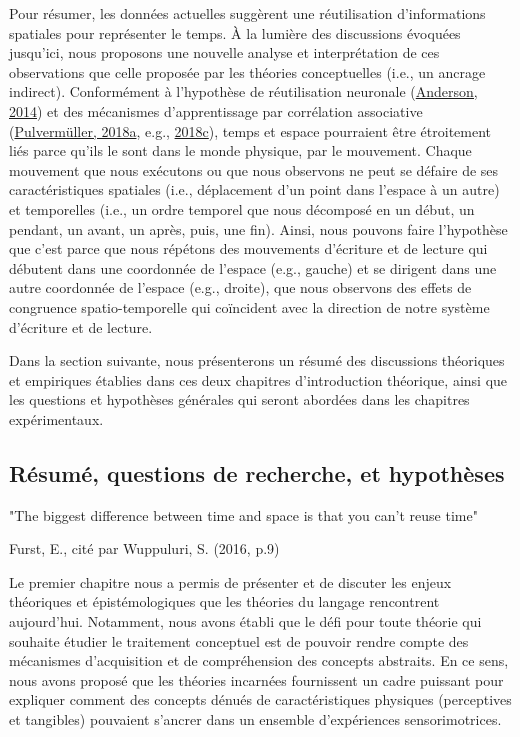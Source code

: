 \documentclass[
  a4paper,12pt,twoside,onecolumn,openright,final,oldfontcommands]{memoir}
\begin{document}
Pour résumer, les données actuelles suggèrent une réutilisation d'informations spatiales pour représenter le temps. À la lumière des discussions évoquées jusqu'ici, nous proposons une nouvelle analyse et interprétation de ces observations que celle proposée par les théories conceptuelles (i.e., un ancrage indirect). Conformément à l'hypothèse de réutilisation neuronale (\protect\hyperlink{ref-anderson_after_2014}{Anderson, 2014}) et des mécanismes d'apprentissage par corrélation associative (\protect\hyperlink{ref-pulvermuller_neural_2018}{Pulvermüller, 2018a}, e.g., \protect\hyperlink{ref-pulvermuller_case_2018}{2018c}), temps et espace pourraient être étroitement liés parce qu'ils le sont dans le monde physique, par le mouvement. Chaque mouvement que nous exécutons ou que nous observons ne peut se défaire de ses caractéristiques spatiales (i.e., déplacement d'un point dans l'espace à un autre) et temporelles (i.e., un ordre temporel que nous décomposé en un début, un pendant, un avant, un après, puis, une fin). Ainsi, nous pouvons faire l'hypothèse que c'est parce que nous répétons des mouvements d'écriture et de lecture qui débutent dans une coordonnée de l'espace (e.g., gauche) et se dirigent dans une autre coordonnée de l'espace (e.g., droite), que nous observons des effets de congruence spatio-temporelle qui coïncident avec la direction de notre système d'écriture et de lecture.

Dans la section suivante, nous présenterons un résumé des discussions théoriques et empiriques établies dans ces deux chapitres d'introduction théorique, ainsi que les questions et hypothèses générales qui seront abordées dans les chapitres expérimentaux.

\hypertarget{predictionth}{%
\subsection{Résumé, questions de recherche, et hypothèses}\label{predictionth}}

\epigraph{"The biggest difference between time and space is that you can’t reuse time"}{Furst, E., cité par Wuppuluri, S. (2016, p.9)}

Le premier chapitre nous a permis de présenter et de discuter les enjeux théoriques et épistémologiques que les théories du langage rencontrent aujourd'hui. Notamment, nous avons établi que le défi pour toute théorie qui souhaite étudier le traitement conceptuel est de pouvoir rendre compte des mécanismes d'acquisition et de compréhension des concepts abstraits. En ce sens, nous avons proposé que les théories incarnées fournissent un cadre puissant pour expliquer comment des concepts dénués de caractéristiques physiques (perceptives et tangibles) pouvaient s'ancrer dans un ensemble d'expériences sensorimotrices.
\end{document}
